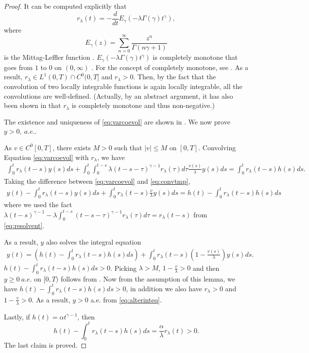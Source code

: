 \documentclass[12pt]{amsart}%
\theoremstyle{definition}
\theoremstyle{remark}
\renewcommand{\ge}{\geqslant}
\renewcommand{\le}{\leqslant}
\begin{document}
\begin{proof}
It can be computed explicitly that \[
r_{\lambda}(t)=-\frac{d}{dt}E_{\gamma}(-\lambda\Gamma(\gamma)t^{\gamma}),
\]
where \[
E_{\gamma}(z)=\sum_{n=0}^{\infty}\frac{z^n}{\Gamma(n\gamma+1)}
\] is the Mittag-Leffler function \cite{mg00,hms11}. $E_{\gamma}(-\lambda\Gamma(\gamma)t^{\gamma})$ is completely monotone that goes from $1$ to $0$ on $(0,\infty)$ \cite{mg00}.  For the concept of completely monotone, see \cite{widder41}.  As a result, $r_{\lambda}\in L^1(0,T)\cap C^0(0,T]$ and $r_{\lambda}>0$. Then, by the fact that the convolution of two locally integrable functions is again locally integrable, all the convolutions are well-defined. (Actually, by an abstract argument, it has also been shown in \cite[Lemma 2.1]{cn79} that $r_{\lambda}$ is  completely monotone and thus non-negative.)

The existence and uniqueness of \eqref{eq:varcoevol} are shown in \cite[Lemma 1]{mf71}. We now prove $y>0,~a.e.$. 

As $v\in C^0[0, T]$, there exists $M>0$ such that $|v|\le M$ on $[0, T]$.  Convolving Equation \eqref{eq:varcoevol} with $r_{\lambda}$, we have
\begin{gather}\label{eq:convtmp}
\int_0^tr_{\lambda}(t-s)y(s)ds+\int_0^t\int_0^{t-s}\lambda(t-s-\tau)^{\gamma-1}r_{\lambda}(\tau)d\tau \frac{v(s)}{\lambda} y(s)ds=\int_0^tr_{\lambda}(t-s)h(s)ds.
\end{gather}
Taking the difference between \eqref{eq:varcoevol} and \eqref{eq:convtmp}, 
\begin{gather*}
y(t)-\int_0^tr_{\lambda}(t-s)y(s)ds+\int_0^tr_{\lambda}(t-s)\frac{v}{\lambda}y(s)ds=h(t)-\int_0^tr_{\lambda}(t-s)h(s)ds
\end{gather*}
where we used the fact $\lambda (t-s)^{\gamma-1}-\lambda\int_0^{t-s}(t-s-\tau)^{\gamma-1}r_{\lambda}(\tau)d\tau=r_{\lambda}(t-s)$ from \eqref{eq:resolvent}.

As a result, $y$ also solves the integral equation
\begin{gather}\label{eq:alterinteq}
y(t)=\left(h(t)-\int_0^tr_{\lambda}(t-s)h(s)ds\right)
+\int_0^t r_{\lambda}(t-s)\left(1-\frac{v(s)}{\lambda}\right) y(s)ds.
\end{gather}
$h(t)-\int_0^tr_{\lambda}(t-s)h(s)ds>0$. Picking $\lambda>M$, $1-\frac{v}{\lambda}>0$ and then $y\ge 0~a.e.$ on $[0, T)$ follows from \cite[Lemma 1]{mf71}. Now from the assumption of this lemma, we have $h(t)-\int_0^tr_{\lambda}(t-s)h(s)ds>0$, in addition we also have $r_{\lambda}>0$ and $1-\frac{v}{\lambda}>0$. As a result, $y>0$ a.e. from \eqref{eq:alterinteq}.

Lastly, if $h(t)=\alpha t^{\gamma-1}$, then \[
h(t)-\int_0^tr_{\lambda}(t-s)h(s)ds=\frac{\alpha}{\lambda} r_{\lambda}(t)>0.
\]
The last claim is proved.
\end{proof}
\end{document}
